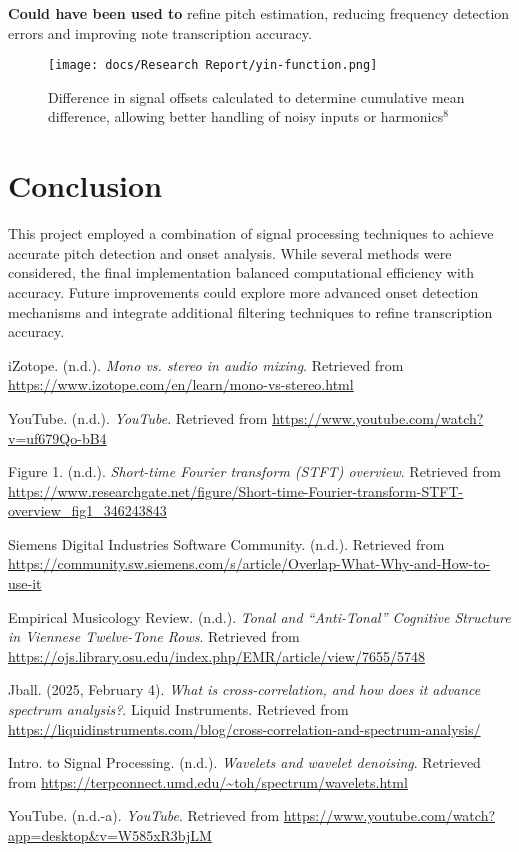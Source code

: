 \documentclass{article}
\begin{document}
\textbf{Could have been used to} refine pitch estimation, reducing frequency detection errors and improving note transcription accuracy.

\begin{figure}[h]
\texttt{[image: docs/Research Report/yin-function.png]}
\caption{Difference in signal offsets calculated to determine cumulative mean difference, allowing better handling of noisy inputs or harmonics$^8$}
\end{figure}

\newpage


\section{Conclusion}
This project employed a combination of signal processing techniques to achieve accurate pitch detection and onset analysis. While several methods were considered, the final implementation balanced computational efficiency with accuracy. Future improvements could explore more advanced onset detection mechanisms and integrate additional filtering techniques to refine transcription accuracy.


\newpage
\begin{thebibliography}{9}

iZotope. (n.d.). \textit{Mono vs. stereo in audio mixing}. Retrieved from \url{https://www.izotope.com/en/learn/mono-vs-stereo.html}

YouTube. (n.d.). \textit{YouTube}. Retrieved from \url{https://www.youtube.com/watch?v=uf679Qo-bB4}

Figure 1. (n.d.). \textit{Short-time Fourier transform (STFT) overview}. Retrieved from \url{https://www.researchgate.net/figure/Short-time-Fourier-transform-STFT-overview_fig1_346243843}

Siemens Digital Industries Software Community. (n.d.). Retrieved from \url{https://community.sw.siemens.com/s/article/Overlap-What-Why-and-How-to-use-it}

Empirical Musicology Review. (n.d.). \textit{Tonal and “Anti-Tonal” Cognitive Structure in Viennese Twelve-Tone Rows}. Retrieved from \url{https://ojs.library.osu.edu/index.php/EMR/article/view/7655/5748}

Jball. (2025, February 4). \textit{What is cross-correlation, and how does it advance spectrum analysis?}. Liquid Instruments. Retrieved from \url{https://liquidinstruments.com/blog/cross-correlation-and-spectrum-analysis/}

Intro. to Signal Processing. (n.d.). \textit{Wavelets and wavelet denoising}. Retrieved from \url{https://terpconnect.umd.edu/~toh/spectrum/wavelets.html}

YouTube. (n.d.-a). \textit{YouTube}. Retrieved from \url{https://www.youtube.com/watch?app=desktop&v=W585xR3bjLM}

\end{thebibliography}
\end{document}
